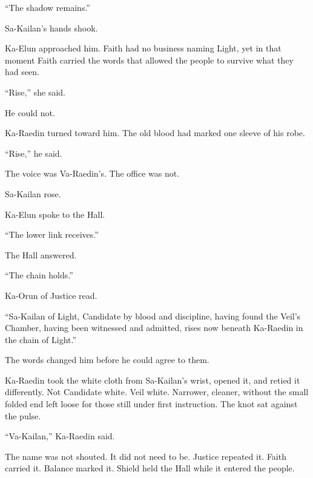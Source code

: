 “The shadow remains.”\par

Sa-Kailan’s hands shook.\par

Ka-Elun approached him. Faith had no business naming Light, yet in that moment Faith carried the words that allowed the people to survive what they had seen.\par

“Rise,” she said.\par

He could not.\par

Ka-Raedin turned toward him. The old blood had marked one sleeve of his robe.\par

“Rise,” he said.\par

The voice was Va-Raedin’s. The office was not.\par

Sa-Kailan rose.\par

Ka-Elun spoke to the Hall.\par

“The lower link receives.”\par

The Hall answered.\par

“The chain holds.”\par

Ka-Orun of Justice read.\par

“Sa-Kailan of Light, Candidate by blood and discipline, having found the Veil’s Chamber, having been witnessed and admitted, rises now beneath Ka-Raedin in the chain of Light.”\par

The words changed him before he could agree to them.\par

Ka-Raedin took the white cloth from Sa-Kailan’s wrist, opened it, and retied it differently. Not Candidate white. Veil white. Narrower, cleaner, without the small folded end left loose for those still under first instruction. The knot sat against the pulse.\par

“Va-Kailan,” Ka-Raedin said.\par

The name was not shouted. It did not need to be. Justice repeated it. Faith carried it. Balance marked it. Shield held the Hall while it entered the people.\par

